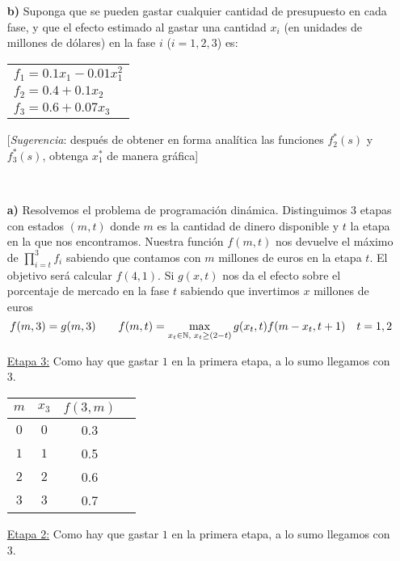 \documentclass[twoside]{article}
\begin{document}
\begin{ejercicio}{1}
\begin{itemize}
\item[\textbf{b)}] Suponga que se pueden gastar cualquier cantidad de presupuesto en cada fase, y que el efecto estimado al gastar una cantidad $x_i$ (en unidades de millones de dólares) en la fase $i$ ($i=1,2,3$) es:

\begin{tabular}{l}
$f_1=0.1x_1-0.01x_1^2$\\
$f_2=0.4+0.1x_2$\\
$f_3=0.6+0.07x_3$
\end{tabular}

[\emph{Sugerencia}: después de obtener en forma analítica las funciones $f_2^*(s)$ y $f_3^*(s)$, obtenga $x_1^*$ de manera gráfica]
\end{itemize}
\end{ejercicio}
\begin{solucion}
\
\begin{itemize}
\item[\textbf{a)}] 
Resolvemos el problema de programación dinámica. Distinguimos $3$ etapas con estados $(m,t)$ donde $m$ es la cantidad de dinero disponible y $t$ la etapa en la que nos encontramos. Nuestra función $f(m,t)$ nos devuelve el máximo de $\prod_{i=t}^3 f_i$ sabiendo que contamos con $m$ millones de euros en la etapa $t$. El objetivo será calcular $f(4,1)$. Si $g(x,t)$ nos da el efecto sobre el porcentaje de mercado en la fase $t$ sabiendo que invertimos $x$ millones de euros
$$
f(m,3) = g(m,3) \qquad f(m,t) = \max_{x_t\in\mathbb{N},\;x_t\geq (2-t)} g(x_t,t)f(m-x_t,t+1) \quad t=1,2
$$

\underline{Etapa 3:} Como hay que gastar $1$ en la primera etapa, a lo sumo llegamos con $3$.
\begin{center}
\begin{tabular}{|c| c| c| c |}
\hline
$m$ & $x_3$ & $f(3,m)$ \\
\hline
$0$ & $0$ & 0.3   \\
\hline         
$1$ & $1$ & 0.5 \\
\hline        
$2$ & $2$ & 0.6  \\
\hline
$3$ & $3$  & 0.7   \\
\hline
\end{tabular}
\end{center}
\underline{Etapa 2:} Como hay que gastar $1$ en la primera etapa, a lo sumo llegamos con $3$.


\end{itemize}
\end{solucion}
\end{document}
